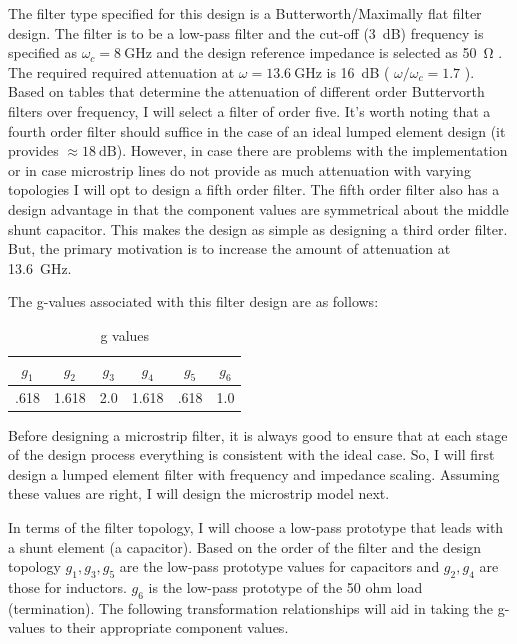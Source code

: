 The filter type specified for this design is a Butterworth/Maximally flat filter
design. The filter is to be a low-pass filter and the cut-off
(\SI{3}{\deci\bel}) frequency is specified as $ \omega_c = \SI{8}{\giga\hertz}$
and the design reference impedance is selected as \SI{50}{\ohm} . The required
required attenuation at $ \omega = \SI{13.6}{\giga\hertz}$ is \SI{16}{\deci\bel}
( $ \omega/\omega_c = 1.7 $ ). Based on tables that determine the attenuation of
different order Buttervorth filters over frequency, I will select a filter of
order five.  It's worth noting that a fourth order filter should suffice in the
case of an ideal lumped element design (it provides $\approx
\SI{18}{\deci\bel}$).  However, in case there are problems
with the implementation or in case microstrip lines do not provide as much
attenuation with varying topologies I will opt to design a fifth order filter.
The fifth order filter also has a design advantage in that the component values
are symmetrical about the middle shunt capacitor. This makes the design as
simple as designing a third order filter. But, the primary motivation is to
increase the amount of attenuation at \SI{13.6}{\giga\hertz}.

The g-values associated with this filter design are as follows:

\begin{table}[H]
    \centering
    \caption{g values}
    \label{tab:1a_g_value_table}
    \begin{tabular}{|c|c|c|c|c|c|}
        \hline $g_{1}$ & $g_{2}$  & $ g_{3} $ & $ g_{4} $ & $ g_{5} $ & $
        g_{6} $ \\ 
        \hline .618    & 1.618    & 2.0       &  1.618    & .618 & 1.0 \\
        \hline
    \end{tabular}
\end{table}

Before designing a microstrip filter, it is always good to ensure that at each
stage of the design process everything is consistent with the ideal case. So, I
will first design a lumped element filter with frequency and impedance scaling.
Assuming these values are right, I will design the microstrip model next.

In terms of the filter topology, I will choose a low-pass prototype that leads
with a shunt element (a capacitor). Based on the order of the filter and the
design topology $g_{1}, g_{3}, g_{5}$ are the low-pass prototype values for
capacitors and $g_{2}, g_{4}$ are those for inductors. $g_{6}$ is the low-pass
prototype of the 50 ohm load (termination). The following transformation
relationships will aid in taking the g-values to their appropriate component
values.


